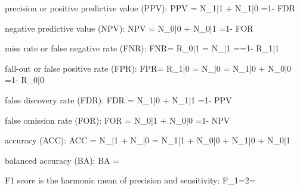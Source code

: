 precision or positive predictive value (PPV):
\beq 
{  {PPV} ={
{ {N_{1|1}} + {N_{1|0}} }}=1- {FDR} }
\eeq

negative predictive value (NPV):
\beq 
{  {NPV} ={
{ {N_{0|0}} + {N_{0|1}} }}=1- {FOR} }
\eeq

miss rate or false negative rate (FNR):
\beq FNR=
{  {R_{0|1}} ={
{ {N_{|1}} }}={}=1- {R_{1|1}} }
\eeq

fall-out or false positive rate (FPR):
\beq FPR=
{  {R_{1|0}} ={
{ {N_{|0}} }}={
{ {N_{1|0}} + {N_{0|0}} }}=1- {R_{0|0}} }
\eeq

false discovery rate (FDR):
\beq 
{  {FDR} ={
{ {N_{1|0}} + {N_{1|1}} }}=1- {PPV} }
\eeq

false omission rate (FOR):
\beq 
{  {FOR} ={
{ {N_{0|1}} + {N_{0|0}} }}=1- {NPV} }
\eeq


accuracy (ACC):
\beq 
{  {ACC} ={
{ {N_{|1}} + {N_{|0}} }}={
{ {N_{1|1}} + {N_{0|0}} + {N_{1|0}} + {N_{0|1}}
 }}}
\eeq

balanced accuracy (BA):
\beq 
{  {BA} ={}}
\eeq

F1 score
is the harmonic mean of precision and sensitivity: 
\beq 
{  {F}_{1}=2=
{}}
\eeq

